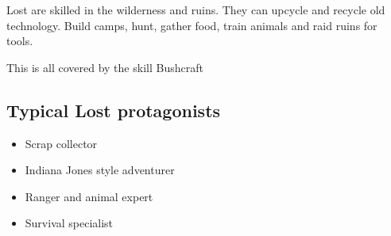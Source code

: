 Lost are skilled in the wilderness and ruins. They can upcycle and recycle old technology. Build camps, hunt, gather food, train animals and raid ruins for tools.

This is all covered by the skill Bushcraft

\subsection{Typical Lost protagonists}

\begin{itemize}
    \item Scrap collector
    \item Indiana Jones style adventurer
    \item Ranger and animal expert
    \item Survival specialist
\end{itemize}

